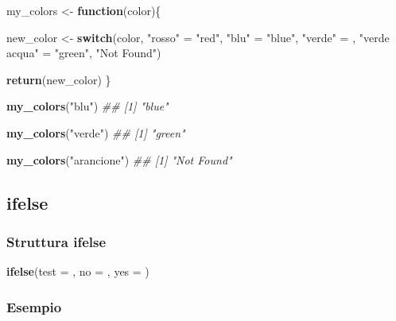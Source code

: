 \documentclass[
]{book}
\newenvironment{Shaded}{\begin{snugshade}}{\end{snugshade}}
\newcommand{\CommentTok}[1]{\textcolor[rgb]{0.56,0.35,0.01}{\textit{#1}}}
\newcommand{\ControlFlowTok}[1]{\textcolor[rgb]{0.13,0.29,0.53}{\textbf{#1}}}
\newcommand{\DataTypeTok}[1]{\textcolor[rgb]{0.13,0.29,0.53}{#1}}
\newcommand{\KeywordTok}[1]{\textcolor[rgb]{0.13,0.29,0.53}{\textbf{#1}}}
\newcommand{\NormalTok}[1]{#1}
\newcommand{\StringTok}[1]{\textcolor[rgb]{0.31,0.60,0.02}{#1}}
\begin{document}
\begin{Shaded}
\begin{Highlighting}[]
\NormalTok{my_colors <-}\StringTok{ }\ControlFlowTok{function}\NormalTok{(color)\{}
  
\NormalTok{  new_color <-}\StringTok{ }\ControlFlowTok{switch}\NormalTok{(color,}
       \StringTok{"rosso"}\NormalTok{ =}\StringTok{ "red"}\NormalTok{,}
       \StringTok{"blu"}\NormalTok{ =}\StringTok{ "blue"}\NormalTok{,}
       \StringTok{"verde"}\NormalTok{ =}\StringTok{ }\NormalTok{,}
       \StringTok{"verde acqua"}\NormalTok{ =}\StringTok{ "green"}\NormalTok{,}
       \StringTok{"Not Found"}\NormalTok{)}
  
  \KeywordTok{return}\NormalTok{(new_color)}
\NormalTok{\}}

\KeywordTok{my_colors}\NormalTok{(}\StringTok{"blu"}\NormalTok{)}
\CommentTok{## [1] "blue"}

\KeywordTok{my_colors}\NormalTok{(}\StringTok{"verde"}\NormalTok{)}
\CommentTok{## [1] "green"}

\KeywordTok{my_colors}\NormalTok{(}\StringTok{"arancione"}\NormalTok{)}
\CommentTok{## [1] "Not Found"}
\end{Highlighting}
\end{Shaded}

\hypertarget{ifelse-1}{%
\subsection{ifelse}\label{ifelse-1}}

\hypertarget{struttura-ifelse}{%
\subsubsection*{Struttura ifelse}\label{struttura-ifelse}}

\begin{Shaded}
\begin{Highlighting}[]
\KeywordTok{ifelse}\NormalTok{(}\DataTypeTok{test =}\NormalTok{ , }\DataTypeTok{no =}\NormalTok{ , }\DataTypeTok{yes =}\NormalTok{ )}
\end{Highlighting}
\end{Shaded}

\hypertarget{esempio-4}{%
\subsubsection*{Esempio}\label{esempio-4}}
\end{document}
